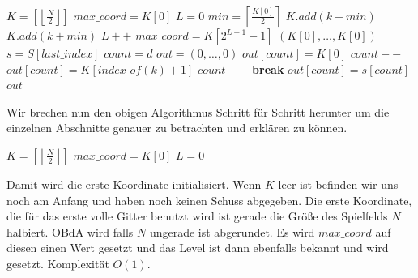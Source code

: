 \documentclass[a4paper,12pt]{llncs}
\numberwithin{equation}{section}
\begin{document}
\begin{tcolorbox}
	\begin{algorithmic}
		\State $K=\left[\left\lfloor\frac{N}{2}\right\rfloor\right]$
		\State $max\_coord=K\left[0\right]$
		\State $L=0$
		\EndIf
		\State $min=\left\lceil\frac{K[0]}{2}\right\rceil$
		\State $K.add(k-min)$
		\State $K.add(k+min)$
		\EndFor
		\State $L++$
		\State $max\_coord=K\left[2^{L-1}-1\right]$
		\EndIf
		\State \Return $(K[0],\dots,K[0])$
		\Else
		\State $s=S[last\_index]$
		\State $count =d$
		\State $out=(0,\dots,0)$
		\State $out[count]=K[0]$
		\State $count--$
		\Else
		\State $out[count]=K[index\_of(k)+1]$
		\State $count--$
		\State \textbf{break}
		\EndIf
		\EndFor
		\State $out[count]=s[count]$
		\EndFor
		\State\Return $out$
		\EndIf
		\EndWhile
		\EndIf
		\EndFunction
	\end{algorithmic}
\end{tcolorbox}

Wir brechen nun den obigen Algorithmus Schritt für Schritt herunter um die einzelnen Abschnitte genauer zu betrachten und erklären zu können.

\begin{tcolorbox}
	\begin{algorithmic}
		\If{$K=\emptyset$}
		\State $K=\left[\left\lfloor\frac{N}{2}\right\rfloor\right]$
		\State $max\_coord=K\left[0\right]$
		\State $L=0$
		\EndIf
	\end{algorithmic}
\end{tcolorbox}

Damit wird die erste Koordinate initialisiert. Wenn $K$ leer ist befinden wir uns noch am Anfang und haben noch keinen Schuss abgegeben. Die erste Koordinate, die für das erste volle Gitter benutzt wird ist gerade die Größe des Spielfelds $N$ halbiert. OBdA wird falls $N$ ungerade ist abgerundet. Es wird $max\_coord$ auf diesen einen Wert gesetzt und das Level ist dann ebenfalls bekannt und wird gesetzt. Komplexität $O(1)$.
\end{document}
